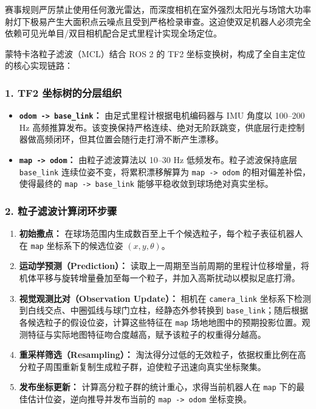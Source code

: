 赛事规则严厉禁止使用任何激光雷达，而深度相机在室外强烈太阳光与场馆大功率射灯下极易产生大面积点云噪点且受到严格检录审查。这迫使双足机器人必须完全依赖可见光单目/双目相机配合足式里程计实现全场定位。

蒙特卡洛粒子滤波（MCL）结合 ROS 2 的 TF2 坐标变换树，构成了全自主定位的核心实现链路：

\subsubsection{1. TF2 坐标树的分层组织}
\begin{itemize}[leftmargin=*]
    \item \textbf{\texttt{odom -> base\_link}：} 由足式里程计根据电机编码器与 IMU 角度以 100--200 Hz 高频推算发布。该变换保持严格连续、绝对无阶跃跳变，供底层行走控制器做高频闭环，但其位置会随行走打滑不断产生漂移。
    \item \textbf{\texttt{map -> odom}：} 由粒子滤波算法以 10--30 Hz 低频发布。粒子滤波保持底层 \texttt{base\_link} 连续位姿不变，将累积漂移解算为 \texttt{map -> odom} 的相对偏差补偿，使得最终的 \texttt{map -> base\_link} 能够平稳收敛到球场绝对真实坐标。
\end{itemize}

\subsubsection{2. 粒子滤波计算闭环步骤}
\begin{enumerate}[leftmargin=*]
    \item \textbf{初始撒点：} 在球场范围内生成数百至上千个候选粒子，每个粒子表征机器人在 \texttt{map} 坐标系下的候选位姿 $(x, y, \theta)$。
    \item \textbf{运动学预测（Prediction）：} 读取上一周期至当前周期的里程计位移增量，将机体平移与旋转增量叠加至每一个粒子，并加入高斯扰动以模拟足底打滑。
    \item \textbf{视觉观测比对（Observation Update）：} 相机在 \texttt{camera\_link} 坐标系下检测到白线交点、中圈弧线与球门立柱，经静态外参转换到 \texttt{base\_link}；随后根据各候选粒子的假设位姿，计算这些特征在 \texttt{map} 场地地图中的预期投影位置。观测特征与实际地图特征吻合度越高，赋予该粒子的权重得分越高。
    \item \textbf{重采样筛选（Resampling）：} 淘汰得分过低的无效粒子，依据权重比例在高分粒子周围重新复制生成粒子群，迫使粒子迅速向真实坐标聚集。
    \item \textbf{发布坐标更新：} 计算高分粒子群的统计重心，求得当前机器人在 \texttt{map} 下的最佳估计位姿，逆向推导并发布当前的 \texttt{map -> odom} 坐标变换。
\end{enumerate}

